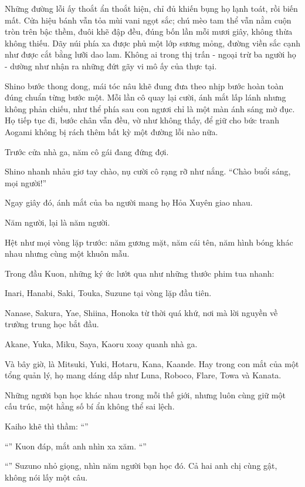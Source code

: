\documentclass[../main.tex]{subfiles}
\begin{document}
Những đường lỗi ấy thoắt ẩn thoắt hiện, chỉ đủ khiến bụng họ lạnh toát, rồi biến mất. Cửa hiệu bánh vẫn tỏa mùi vani ngọt sắc; chú mèo tam thể vẫn nằm cuộn tròn trên bậc thềm, đuôi khẽ đập đều, đúng bốn lần mỗi mươi giây, không thừa không thiếu. Dãy núi phía xa được phủ một lớp sương mỏng, đường viền sắc cạnh như được cắt bằng lưỡi dao lam. Không ai trong thị trấn - ngoại trừ ba người họ - dường như nhận ra những đứt gãy vi mô ấy của thực tại.

Shino bước thong dong, mái tóc nâu khẽ đung đưa theo nhịp bước hoàn toàn đúng chuẩn từng bước một. Mỗi lần cô quay lại cười, ánh mắt lấp lánh nhưng không phản chiếu, như thể phía sau con ngươi chỉ là một màn ánh sáng mờ đục. Họ tiếp tục đi, bước chân vẫn đều, vờ như không thấy, để giữ cho bức tranh Aogami không bị rách thêm bất kỳ một đường lỗi nào nữa.

\ct

Trước cửa nhà ga, năm cô gái đang đứng đợi.

Shino nhanh nhảu giơ tay chào, nụ cười cô rạng rỡ như nắng. ``Chào buổi sáng, mọi người!''


Ngay giây đó, ánh mắt của ba người mang họ Hỏa Xuyên giao nhau.

Năm người, lại là năm người.

Hệt như mọi vòng lặp trước: năm gương mặt, năm cái tên, năm hình bóng khác nhau nhưng cùng một khuôn mẫu.

Trong đầu Kuon, những ký ức lướt qua như những thước phim tua nhanh:

Inari, Hanabi, Saki, Touka, Suzune tại vòng lặp đầu tiên.

Nanase, Sakura, Yae, Shiina, Honoka từ thời quá khứ, nơi mà lời nguyền về trường trung học bắt đầu.

Akane, Yuka, Miku, Saya, Kaoru xoay quanh nhà ga.

Và bây giờ, là Mitsuki, Yuki, Hotaru, Kana, Kaande. Hay trong con mắt của một tổng quản lý, họ mang dáng dấp như Luna, Roboco, Flare, Towa và Kanata.

Những người bạn học khác nhau trong mỗi thế giới, nhưng luôn cùng giữ một cấu trúc, một hằng số bí ẩn không thể sai lệch.

Kaiho khẽ thì thầm: ``''

``'' Kuon đáp, mắt anh nhìn xa xăm. ``''

``'' Suzuno nhỏ giọng, nhìn năm người bạn học đó. Cả hai anh chị cùng gật, không nói lấy một câu.
\end{document}
